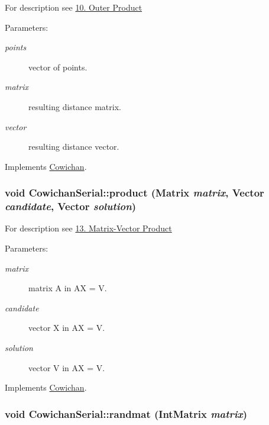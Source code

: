 For description see \hyperlink{index_outer_sec}{10. Outer Product} \begin{Desc}
\item[Parameters:]
\begin{description}
\item[{\em points}]vector of points. \item[{\em matrix}]resulting distance matrix. \item[{\em vector}]resulting distance vector. \end{description}
\end{Desc}


Implements \hyperlink{class_cowichan_52f17221019290b88334b0ca7f3bcdb9}{Cowichan}.\hypertarget{class_cowichan_serial_00411b35445d7d3038b96d53e43bdffa}{
\subsubsection[{product}]{\setlength{\rightskip}{0pt plus 5cm}void CowichanSerial::product ({\bf Matrix} {\em matrix}, \/  {\bf Vector} {\em candidate}, \/  {\bf Vector} {\em solution})}}
\label{class_cowichan_serial_00411b35445d7d3038b96d53e43bdffa}


For description see \hyperlink{index_product_sec}{13. Matrix-Vector Product} \begin{Desc}
\item[Parameters:]
\begin{description}
\item[{\em matrix}]matrix A in AX = V. \item[{\em candidate}]vector X in AX = V. \item[{\em solution}]vector V in AX = V. \end{description}
\end{Desc}


Implements \hyperlink{class_cowichan_3d7d4b581a1d6f0392dc452830fb3b03}{Cowichan}.\hypertarget{class_cowichan_serial_2d24c0e562f7b109ec2ed916f38e5911}{
\subsubsection[{randmat}]{\setlength{\rightskip}{0pt plus 5cm}void CowichanSerial::randmat ({\bf IntMatrix} {\em matrix})}}
\label{class_cowichan_serial_2d24c0e562f7b109ec2ed916f38e5911}


